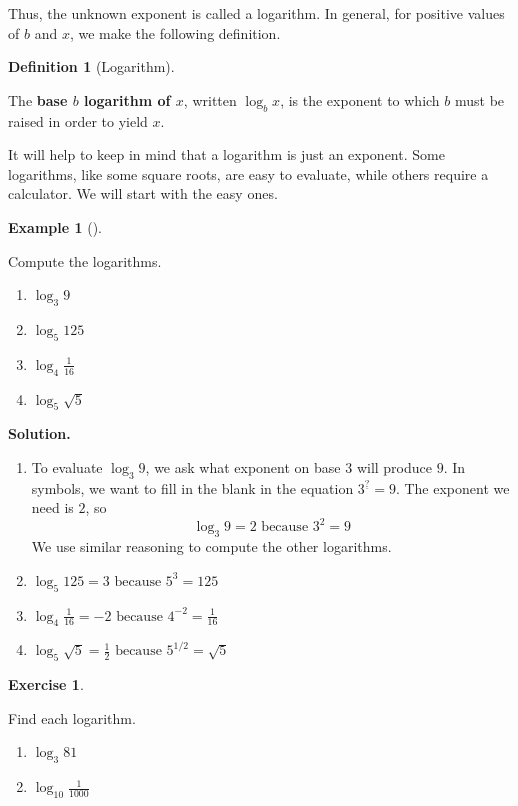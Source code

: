 \documentclass[10pt,]{book}
\newcommand{\terminology}[1]{\textbf{#1}}
\theoremstyle{plain}
\theoremstyle{definition}
\newtheorem{definition}[theorem]{Definition}
\theoremstyle{definition}
\newtheorem{example}[theorem]{Example}
\theoremstyle{definition}
\newtheorem{exercise}[theorem]{Exercise}
\begin{document}
	Thus, the unknown exponent is called a logarithm. In general, for positive values of \(b\) and \(x\), we make the following definition.
%
\begin{definition}[Logarithm]\label{definition-1}

	The \terminology{base \(b\) logarithm of \(x\)}, written \(\log_{b} x\), is the exponent to which \(b\) must be raised in order to yield \(x\).
\end{definition}
\par

	It will help to keep in mind that a logarithm is just an exponent. Some logarithms, like some square roots, are easy to evaluate, while others require a calculator. We will start with the easy ones.
%
\begin{example}[]\label{example-easy-logarithm}

	Compute the logarithms.
	\leavevmode%
\begin{enumerate}[label=*\alph**]
\item\hypertarget{li-1}{}\(\log_3 9\)\item\hypertarget{li-2}{}\(\log_5 125 \)\item\hypertarget{li-3}{}\(\log_4 \frac{1}{16}\)\item\hypertarget{li-4}{}\(\log_5 \sqrt{5}\)\end{enumerate}

%
\par\medskip\noindent%
\textbf{Solution.}\quad \leavevmode%
\begin{enumerate}[label=*\alph**]
\item\hypertarget{li-5}{}
		To evaluate \(\log_3 9\), we ask what exponent on base \(3\) will produce \(9\). In symbols, we want to fill in the blank in the equation \(3^{\underline{?}} = 9\). The exponent we need is \(2\), so
		\begin{equation*}\log_3 9 = 2 \text{ because } 3^2 = 9\end{equation*}
		We use similar reasoning to compute the other logarithms.
	\item\hypertarget{li-6}{}\(\log_5{125} = 3 \text{ because } 5^3 = 125\)\item\hypertarget{li-7}{}\(\log_4{\frac{1}{16}}= −2 \text{ because } 4^{−2} = \frac{1}{16}\)\item\hypertarget{li-8}{}\(\log_5{\sqrt{5}} = \frac{1}{2} \text{ because } 5^{1/2} =\sqrt{5}\)\end{enumerate}
\end{example}
\begin{exercise}\label{exercise-easy-logarithms}

	Find each logarithm.
	\leavevmode%
\begin{enumerate}[label=*\alph**]
\item\hypertarget{li-9}{}\(\log_{3}{81}\)\item\hypertarget{li-10}{}\(\log_{10}{\frac{1}{1000}}\)\end{enumerate}
\end{exercise}
\par
\end{document}
